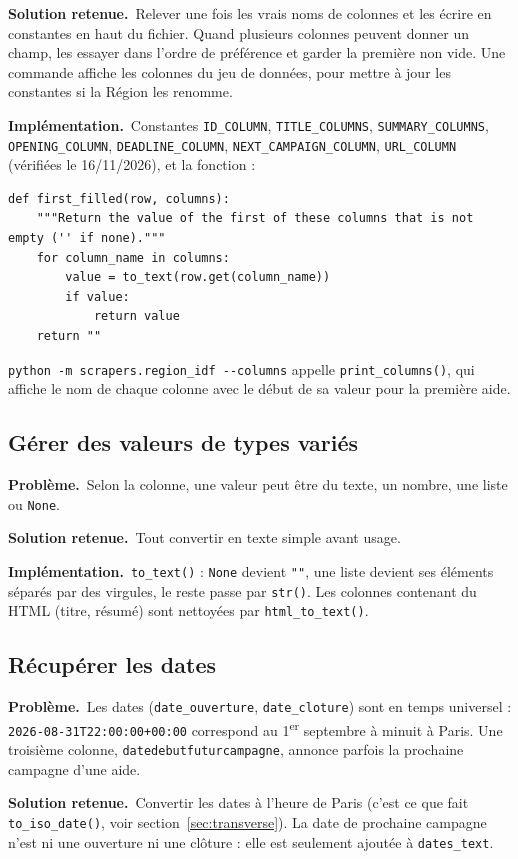 \documentclass[11pt,a4paper]{article}
\newcommand{\pb}{\par\medskip\noindent\textbf{\textcolor{pbcolor}{Problème.}}\ }
\newcommand{\sol}{\par\medskip\noindent\textbf{\textcolor{solcolor}{Solution retenue.}}\ }
\newcommand{\impl}{\par\medskip\noindent\textbf{\textcolor{implcolor}{Implémentation.}}\ }
\newcommand{\code}[1]{\texttt{#1}}
\begin{document}
\sol Relever une fois les vrais noms de colonnes et les écrire en constantes en haut du
fichier. Quand plusieurs colonnes peuvent donner un champ, les essayer dans l'ordre de
préférence et garder la première non vide. Une commande affiche les colonnes du jeu de
données, pour mettre à jour les constantes si la Région les renomme.

\impl Constantes \code{ID\_COLUMN}, \code{TITLE\_COLUMNS}, \code{SUMMARY\_COLUMNS},
\code{OPENING\_COLUMN}, \code{DEADLINE\_COLUMN}, \code{NEXT\_CAMPAIGN\_COLUMN},
\code{URL\_COLUMN} (vérifiées le 16/11/2026), et la fonction :

\begin{lstlisting}
def first_filled(row, columns):
    """Return the value of the first of these columns that is not empty ('' if none)."""
    for column_name in columns:
        value = to_text(row.get(column_name))
        if value:
            return value
    return ""
\end{lstlisting}

\code{python -m scrapers.region\_idf -{}-columns} appelle \code{print\_columns()}, qui affiche
le nom de chaque colonne avec le début de sa valeur pour la première aide.

\subsection{Gérer des valeurs de types variés}

\pb Selon la colonne, une valeur peut être du texte, un nombre, une liste ou \code{None}.

\sol Tout convertir en texte simple avant usage.

\impl \code{to\_text()} : \code{None} devient \code{""}, une liste devient ses éléments
séparés par des virgules, le reste passe par \code{str()}. Les colonnes contenant du HTML
(titre, résumé) sont nettoyées par \code{html\_to\_text()}.

\subsection{Récupérer les dates}

\pb Les dates (\code{date\_ouverture}, \code{date\_cloture}) sont en temps universel :
\code{2026-08-31T22:00:00+00:00} correspond au 1\textsuperscript{er} septembre à minuit à
Paris. Une troisième colonne, \code{datedebutfuturcampagne}, annonce parfois la prochaine
campagne d'une aide.

\sol Convertir les dates à l'heure de Paris (c'est ce que fait \code{to\_iso\_date()},
voir section~\ref{sec:transverse}). La date de prochaine campagne n'est ni une ouverture
ni une clôture : elle est seulement ajoutée à \code{dates\_text}.
\end{document}
